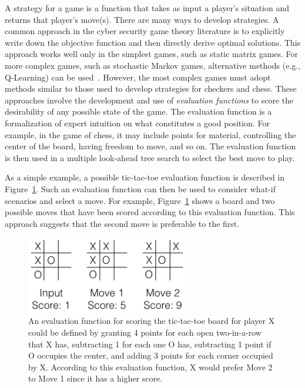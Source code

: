 
A strategy for a game is a function that takes as input a player's situation and returns that player's move(s). There are many ways to develop strategies. A common approach in the cyber security game theory literature is to explicitly write down the objective function and then directly derive optimal solutions. This approach works well only in the simplest games, such as static matrix games. For more complex games, such as stochastic Markov games, alternative methods (e.g., Q-Learning) can be used~\cite{alpcan2006intrusion}. However, the most complex games must adopt methods similar to those used to develop strategies for checkers and chess. These approaches involve the development and use of {\em evaluation functions} to score the desirability of any possible state of the game. The evaluation function is a formalization of expert intuition on what constitutes a good position. For example, in the game of chess, it may include points for material, controlling the center of the board, having freedom to move, and so on. The evaluation function is then used in a multiple look-ahead tree search to select the best move to play.

As a simple example, a possible tic-tac-toe evaluation function is described in Figure~\ref{fig:tictactoe}. Such an evaluation function can then be used to consider what-if scenarios and select a move. For example, Figure~\ref{fig:tictactoe} shows a board and two possible moves that have been scored according to this evaluation function. This approach suggests that the second move is preferable to the first. 

\begin{figure}[h!tbp]
\begin{center}
\includegraphics[width=2.8in]{ttt.png}
\caption{An evaluation function for scoring the tic-tac-toe board for player X could be defined by granting 4 points for each open two-in-a-row that X has, subtracting 1 for each one O has, subtracting 1 point if O occupies the center, and adding 3 points for each corner occupied by X.
According to this evaluation function, X would prefer Move 2 to Move 1 since it has a higher score.\label{fig:tictactoe}}
\end{center}
\end{figure}

